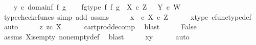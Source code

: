 \begin{isabellebody}
\ \ \isamarkupfalse%
\ {\isachardoublequoteopen}y\ {\isasymin}\isactrlsub c\ domain{\isacharparenleft}{\kern0pt}f\ {\isasymtimes}\isactrlsub f\ g{\isacharparenright}{\kern0pt}{\isachardoublequoteclose}\isanewline
\ \ \isamarkupfalse%
\ fg{\isacharunderscore}{\kern0pt}type{\isacharcolon}{\kern0pt}\ {\isachardoublequoteopen}f\ {\isasymtimes}\isactrlsub f\ g\ {\isacharcolon}{\kern0pt}\ X\ {\isasymtimes}\isactrlsub c\ Z\ \ {\isasymrightarrow}\ Y\ {\isasymtimes}\isactrlsub c\ W{\isachardoublequoteclose}\isanewline
\ \ \ \ \isamarkupfalse%
\ {\isacharparenleft}{\kern0pt}typecheck{\isacharunderscore}{\kern0pt}cfuncs{\isacharcomma}{\kern0pt}\ simp\ add{\isacharcolon}{\kern0pt}\ assms{\isacharparenleft}{\kern0pt}{}{\isacharcomma}{\kern0pt}{}{\isacharparenright}{\kern0pt}{\isacharparenright}{\kern0pt}\isanewline
\ \ \isamarkupfalse%
\ \isamarkupfalse%
\ {\isachardoublequoteopen}x\ \ {\isasymin}\isactrlsub c\ X\ {\isasymtimes}\isactrlsub c\ Z{\isachardoublequoteclose}\isanewline
\ \ \ \ \isamarkupfalse%
\ x{\isacharunderscore}{\kern0pt}type\ cfunc{\isacharunderscore}{\kern0pt}type{\isacharunderscore}{\kern0pt}def\ \isamarkupfalse%
\ auto\isanewline
\ \ \isamarkupfalse%
\ \isamarkupfalse%
\ {\isachardoublequoteopen}{\isasymexists}z{\isachardot}{\kern0pt}\ z{\isasymin}\isactrlsub c\ X{\isachardoublequoteclose}\isanewline
\ \ \ \ \isamarkupfalse%
\ cart{\isacharunderscore}{\kern0pt}prod{\isacharunderscore}{\kern0pt}decomp\ \isamarkupfalse%
\ blast\isanewline
\ \ \isamarkupfalse%
\ \isamarkupfalse%
\ False\isanewline
\ \ \ \ \isamarkupfalse%
\ assms{\isacharparenleft}{\kern0pt}{}{\isacharparenright}{\kern0pt}\ X{\isacharunderscore}{\kern0pt}is{\isacharunderscore}{\kern0pt}empty\ nonempty{\isacharunderscore}{\kern0pt}def\ \isamarkupfalse%
\ blast\isanewline
\ \ \isamarkupfalse%
\ \isamarkupfalse%
\ {\isachardoublequoteopen}x{\isacharequal}{\kern0pt}y{\isachardoublequoteclose}\isanewline
\ \ \ \ \isamarkupfalse%
\ auto\isanewline
{}\isamarkupfalse%
%
\endisatagproof
{\isafoldproof}%
%
\isadelimproof
%
\endisadelimproof
%
\isadelimdocument
%
\endisadelimdocument
%
\isatagdocument
%
\isamarkuptrue%
%
\endisatagdocument
{\isafolddocument}%
%
\isadelimdocument
%
\endisadelimdocument
%
\begin{isamarkuptext}%

\end{isamarkuptext}
\end{isabellebody}
